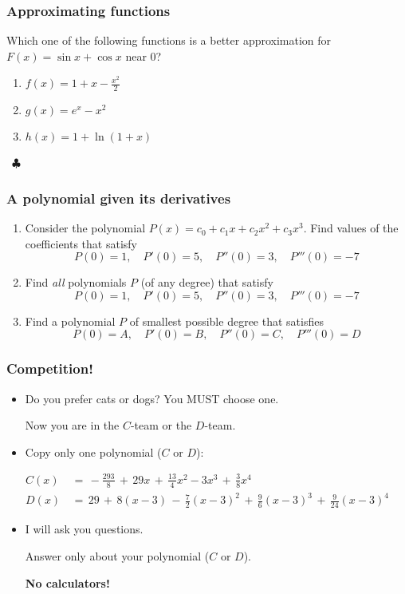 \documentclass[14pt]{beamer}
\newcommand {\DS} [1] {${\displaystyle #1}$}
\newcommand{\p}{\pause}
\newcommand{\setsize}[1]{\fontsize{#1}{#1}\selectfont} %
\newcommand{\smallerfont}{\setsize{13}} %
\newcommand{\vvv}{\vspace{.2cm}}
\begin{document}
\begin{frame}[t]
\frametitle{Approximating functions }

Which one of the following functions is a better approximation for \; \DS{F(x) = \sin x + \cos x} \; near 0?
\vvv
	\begin{enumerate}
		\item  \DS{f(x) = 1 + x - \frac{x^2}{2} }
\vvv		\item  \DS{g(x)  = e^x  -x^2  }
\vvv		\item  \DS{h(x) = 1 + \ln (1+x)}
	\end{enumerate}

\ \hfill \href{https://www.desmos.com/calculator/1hqedw17c8}{$\clubsuit$}

\end{frame}
\begin{frame}[t]
\smallerfont
\frametitle{A polynomial given its derivatives}


	\begin{enumerate}
		\item  Consider the polynomial \DS{P(x)= c_0 + c_1 x + c_2 x^2 + c_3 x^3}.  Find values of the coefficients that satisfy
			$$
				P(0) = 1, \quad P'(0) = 5, \quad P''(0) = 3, \quad P'''(0) = -7			
			$$
		\item Find \emph{all} polynomials $P$ (of any degree) that satisfy
			$$
				P(0) = 1, \quad P'(0) = 5, \quad P''(0) = 3, \quad P'''(0) = -7			
			$$
		\item Find a polynomial $P$ of smallest possible degree that satisfies 
			$$
				P(0) = A, \quad P'(0) = B, \quad P''(0) = C, \quad P'''(0) = D
			$$
	\end{enumerate}

\end{frame}
\begin{frame}[t]
\frametitle{Competition!}

\begin{itemize}
	\item Do you prefer cats or dogs?  You MUST choose one.
	
\p		Now you are in the $C$-team or the $D$-team.

\p
	\item Copy only one polynomial ($C$ or $D$):
\end{itemize}
{\smallerfont
		\begin{align*}
			C(x) & \, = \,  -\frac{293}{8} \, + \, 29x \, + \, \frac{13}{4}x^2-3x^3 \, + \, \frac{3}{8}x^4  \phantom{\int}
				\\
			D(x) & \, = \,  29 \, + \,  8(x -3) \, - \, \frac{7}{2} (x-3)^2 
					\, + \,  \frac{9}{6}(x-3)^3 \, + \, \frac{9}{24}(x-3)^4
		\end{align*}
}
\begin{itemize}
	\item I will ask you questions. 
	
	 Answer only about your polynomial ($C$ or $D$).
	 
	 {\bf No calculators!}
\end{itemize}

\end{frame}
\end{document}
